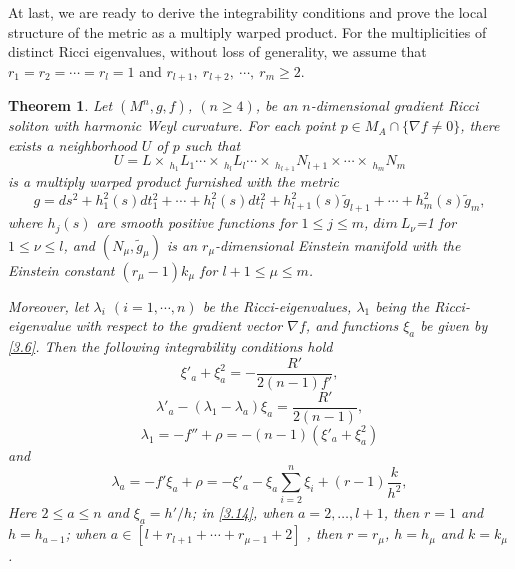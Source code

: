 \documentclass{amsart}
\newtheorem{theorem}{Theorem}[section]
\theoremstyle{definition}
\theoremstyle{remark}
\numberwithin{equation}{section}
\begin{document}
At last, we are ready to derive the integrability conditions and prove the local structure of the metric as a multiply warped product. 
For the multiplicities of distinct Ricci eigenvalues, without loss of generality, 
we assume that $r_{1}=r_{2}=\cdots=r_{l}=1$ and 
$r_{l+1},~ r_{l+2},~\cdots,~ r_{m} \geq2$.  
\begin{theorem} \label{mulwar}
	Let $(M^n, g, f)$, $(n\geq 4)$, be an $n$-dimensional gradient Ricci soliton with harmonic Weyl curvature.
	For each point $p \in M_A \cap \{ \nabla f \neq 0  \}$, there exists a neighborhood $U$ of $p$ 
	such that 
	\[
	U = L\times\,  _{h_1}L_1 \cdots \times\, _{h_l}L_l\cdots \times\, _{h_{l+1}}N_{l+1}\times\cdots \times\, _{h_m}N_{m}
	\]
	is a multiply warped product furnished with the metric 
	\begin{equation} \label{3.10}
	g= ds^2 + h^2_1(s)  dt_1^2 + \cdots 
	+ h^2_l(s) dt_l^2+ h^2_{l+1}(s) \tilde{g}_{l+1}+ \cdots 
	+h^2_{m}(s) \tilde{g}_{m},
	\end{equation}
	where $h_j(s)$ are smooth positive functions for $1\leq j \leq m$,
	$dim ~L_\nu$=1 for $1\leq \nu \leq l$, and 
	$(N_\mu, \tilde{g}_{\mu})$ is an $r_\mu$-dimensional Einstein manifold 
	with the Einstein constant $(r_\mu-1)k_\mu$ for $l+1\leq \mu \leq m$.
	
	\smallskip
	Moreover, 
	let $\lambda_i$ $(i=1,\cdots, n)$ be the Ricci-eigenvalues, $\lambda_1$ being the Ricci-eigenvalue with respect to the gradient vector $\nabla f$,
	and functions $\xi_a$ be given by \eqref{3.6}.	
	Then the following integrability conditions hold
	\begin{equation}\label{3.11}
	\xi'_a+\xi^2_a=-\frac{R'}{2(n-1)f'},
	\end{equation}
	\begin{equation}\label{3.12}
	\lambda'_a-\left(\lambda_1-\lambda_a \right)\xi_a=\frac{R'}{2(n-1)},
	\end{equation}
	\begin{equation}\label{3.13}
	\lambda_{1}=-f''+\rho=-(n-1)\left( \xi'_a+\xi^2_a\right)
	\end{equation}
	and
	\begin{equation}\label{3.14}
	\lambda_a=-f'\xi_a+\rho=- \xi'_a-\xi_a \sum^{n}_{i=2} \xi_i +( r-1)\frac{k}{h^2},
	\end{equation}
	Here $2\leq a\leq n$ and $\xi_a=h'/h$;  in \eqref{3.14}, when $a=2, \dots, l+1$,  then 
	$r=1$ and $h=h_{a-1}$;
	when $a\in \left[ l+r_{l+1}+\cdots+r_{\mu-1} +2\right]$ ,  then 
	$r=r_\mu$, $h=h_{\mu} $ and $k=k_{\mu} $.
\end{theorem}
	
\end{document}

